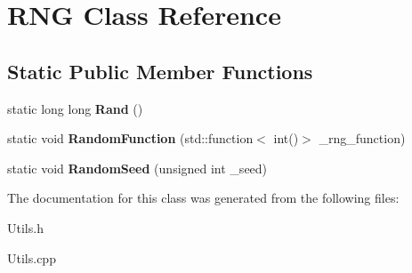 \hypertarget{class_r_n_g}{}\section{R\+NG Class Reference}
\label{class_r_n_g}
\subsection*{Static Public Member Functions}
\begin{DoxyCompactItemize}
\item 
\mbox{\label{class_r_n_g_a427cbd39e534df7411d93ba48c4076ca}} 
static long long {\bfseries Rand} ()
\item 
\mbox{\label{class_r_n_g_aaab24bbee351a128618027d201cabdfb}} 
static void {\bfseries Random\+Function} (std\+::function$<$ int()$>$ \+\_\+rng\+\_\+function)
\item 
\mbox{\label{class_r_n_g_a1a3d5ecdf4b60266eba3b7d375920135}} 
static void {\bfseries Random\+Seed} (unsigned int \+\_\+seed)
\end{DoxyCompactItemize}


The documentation for this class was generated from the following files\+:\begin{DoxyCompactItemize}
\item 
Utils.\+h\item 
Utils.\+cpp\end{DoxyCompactItemize}
